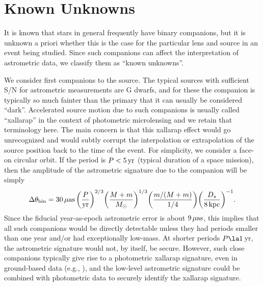 \documentclass[12pt,preprint]{aastex}
\def\muas{{\mu\rm as}}
\begin{document}
\section{{Known Unknowns}
\label{sec:unknown}}

It is known that stars in general frequently have binary companions, but 
it is unknown a priori whether this is the case for the particular 
lens and source in an event being studied.  Since such companions can
affect the interpretation of astrometric data, we classify them as
``known unknowns''.  

We consider first companions to the source.
The typical sources with sufficient S/N for astrometric measurements
are G dwarfs, and for these the companion is
typically so much fainter than the primary \citep{dm91}
that it can usually be considered ``dark''.  Accelerated source motion
due to such companions is usually called ``xallarap'' in the context
of photometric microlensing and we retain that terminology here.
The main concern is that this xallarap effect would go unrecognized
and would subtly corrupt the interpolation or extrapolation of the
source position
back to the time of the event.  For simplicity, we consider a 
face-on circular orbit. If the period is $P<5\,\rm yr$ (typical
duration of a space mission), then the amplitude of the astrometric signature
due to the companion will be simply
\begin{equation}
\Delta\theta_{\rm bin} = 30\,\muas\,
\biggl({P\over {\rm yr}}\biggr)^{2/3}
\biggl({M+m\over M_\odot}\biggr)^{1/3}
\biggl({m/(M+m)\over 1/4}\biggr)
\biggl({D_s\over {\rm 8\,kpc}}\biggr)^{-1}.
\label{eqn:orbit}
\end{equation}
Since the fiducial year-as-epoch astrometric error is about $9\,\muas$, this
implies that all such companions would be directly detectable unless they
had periods smaller than one year and/or had exceptionally low-mass.
At shorter periods $P\la 1\,$yr, the astrometric signature
would not, by itself, be secure.  However, such close companions typically
give rise to a photometric xallarap signature, even in ground-based data
(e.g., \citealt{poindexter05}), and the low-level astrometric signature
could be combined with photometric data to securely identify the xallarap
signature.
\end{document}
